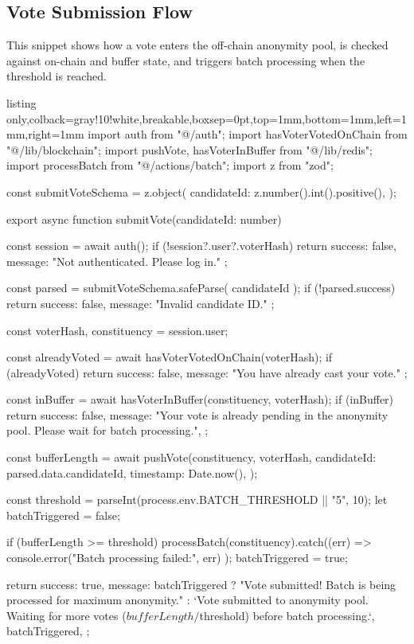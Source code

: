 \subsection{Vote Submission Flow}
This snippet shows how a vote enters the off-chain anonymity pool, is checked against on-chain and buffer state, and triggers batch processing when the threshold is reached.

\begin{tcblisting}{listing only,colback=gray!10!white,breakable,boxsep=0pt,top=1mm,bottom=1mm,left=1mm,right=1mm}
import { auth } from "@/auth";
import { hasVoterVotedOnChain } from "@/lib/blockchain";
import { pushVote, hasVoterInBuffer } from "@/lib/redis";
import { processBatch } from "@/actions/batch";
import { z } from "zod";

const submitVoteSchema = z.object({
  candidateId: z.number().int().positive(),
});

export async function submitVote(candidateId: number) {
  const session = await auth();
  if (!session?.user?.voterHash) {
    return { success: false, message: "Not authenticated. Please log in." };
  }

  const parsed = submitVoteSchema.safeParse({ candidateId });
  if (!parsed.success) {
    return { success: false, message: "Invalid candidate ID." };
  }

  const { voterHash, constituency } = session.user;

  const alreadyVoted = await hasVoterVotedOnChain(voterHash);
  if (alreadyVoted) {
    return { success: false, message: "You have already cast your vote." };
  }

  const inBuffer = await hasVoterInBuffer(constituency, voterHash);
  if (inBuffer) {
    return {
      success: false,
      message: "Your vote is already pending in the anonymity pool. Please wait for batch processing.",
    };
  }

  const bufferLength = await pushVote(constituency, {
    voterHash,
    candidateId: parsed.data.candidateId,
    timestamp: Date.now(),
  });

  const threshold = parseInt(process.env.BATCH_THRESHOLD || "5", 10);
  let batchTriggered = false;

  if (bufferLength >= threshold) {
    processBatch(constituency).catch((err) =>
      console.error("Batch processing failed:", err)
    );
    batchTriggered = true;
  }

  return {
    success: true,
    message: batchTriggered
      ? "Vote submitted! Batch is being processed for maximum anonymity."
      : `Vote submitted to anonymity pool. Waiting for more votes (${bufferLength}/${threshold}) before batch processing.`,
    batchTriggered,
  };
}
\end{tcblisting}
